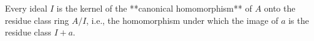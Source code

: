 Every ideal $I$ is the kernel of the **canonical homomorphism** of $A$ onto the residue class ring $A/I$, i.e., the homomorphism under which the image of $a$ is the residue class $I + a$.
